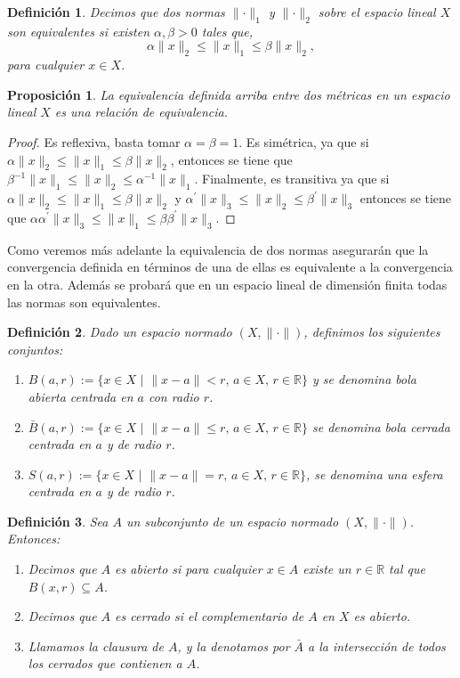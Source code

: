 \documentclass[12pt]{book}
\newtheorem{defn}{\bf Definición}[chapter]
\newtheorem{prop}{\bf Proposición}[chapter]
\begin{document}
\begin{defn} Decimos que dos normas $\lVert \cdot\rVert_1$ y $\lVert \cdot\rVert_2$ sobre el 
espacio lineal $X$ son equivalentes si existen $\alpha,\beta>0$ tales que,
$$\alpha\lVert x\rVert_2\leq\lVert x\rVert_1\leq\beta\lVert x\rVert_2,$$
para cualquier $x\in X$.
\end{defn}
\begin{prop} La equivalencia definida arriba entre dos m\'etricas en un espacio lineal  $X$ es una 
relaci\'on de  equivalencia.
\end{prop}
\begin{proof}
Es reflexiva, basta tomar  $\alpha=\beta=1$. Es sim\'etrica, ya que si $\alpha\lVert 
x\rVert_2\leq\lVert x\rVert_1\leq\beta\lVert x\rVert_2$, entonces se tiene que $\beta^{-1}\lVert 
x\rVert_1\leq\lVert x\rVert_2\leq\alpha^{-1}\lVert x\rVert_1$. Finalmente, es  transitiva ya que si $
\alpha\lVert x\rVert_2\leq\lVert x\rVert_1\leq\beta\lVert x\rVert_2$ y $\alpha^\prime\lVert 
x\rVert_3\leq\lVert x\rVert_2\leq\beta^\prime\lVert x\rVert_3$ entonces se tiene que $
\alpha\alpha^\prime\lVert x\rVert_3\leq\lVert x\rVert_1\leq\beta\beta^\prime\lVert x\rVert_3$.
\end{proof}
 Como veremos m\'as adelante la equivalencia de dos normas asegurar\'an  que la convergencia 
definida en t\'erminos de una de ellas es equivalente a la convergencia en la otra. Adem\'as se 
probar\'a que en un espacio lineal de dimensi\'on finita todas las normas son equivalentes.


\begin{defn}  Dado un espacio normado $(X,\lVert \cdot\rVert)$, definimos los siguientes conjuntos:
\begin{enumerate}
\item $B(a,r):=\{x\in X\,\, | \,\, \lVert x-a\rVert <r,\,a\in X,\,r\in \mathbb{R}\}$ y se denomina bola 
abierta centrada en $a$ con radio $r$.
\item $\bar B(a,r):=\{x\in X\,\,|\,\,\lVert x-a\rVert\leq r,\,a\in X,\,r\in\mathbb{R}\}$ se denomina bola 
cerrada centrada en $a$ y de radio $r$.
\item $S(a,r):=\{x\in X\,\,|\,\,\lVert x-a\rVert=r,\,a\in X,\, r\in\mathbb{R}\}$, se denomina una esfera 
centrada en $a$ y de radio $r$.
\end{enumerate}
\end{defn}

\begin{defn} Sea $A$ un subconjunto de un espacio normado $(X,\lVert \cdot\rVert)$. Entonces:
\begin{enumerate}
\item Decimos que $A$ es abierto si para cualquier $x\in A$  existe un $r\in\mathbb{R}$ tal que 
$B(x,r)\subseteq A$. 
\item Decimos que $A$ es cerrado si el complementario de $A$ en $X$ es abierto.
\item Llamamos la clausura de $A$, y la denotamos por $\bar A$ a la intersecci\'on de todos los 
cerrados que contienen a $A$.
\end{enumerate}
\end{defn}
\end{document}
